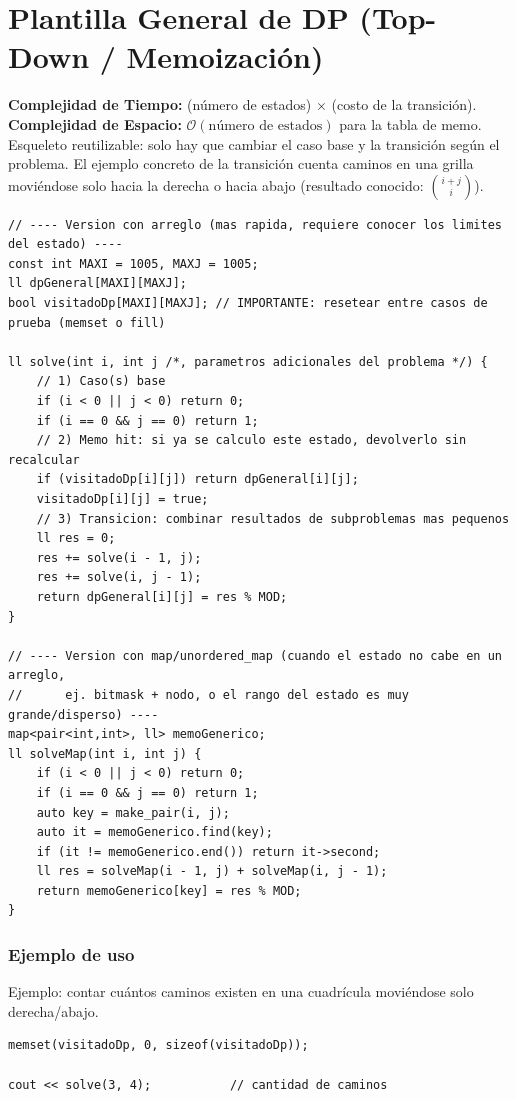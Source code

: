 \documentclass[10pt,twocolumn,letterpaper]{report}
\begin{document}
\section{Plantilla General de DP (Top-Down / Memoización)}
\textbf{Complejidad de Tiempo:} (número de estados) $\times$ (costo de la transición). \\
\textbf{Complejidad de Espacio:} $\mathcal{O}(\text{número de estados})$ para la tabla de memo. \\
Esqueleto reutilizable: solo hay que cambiar el caso base y la transición según el problema. El ejemplo concreto de la transición cuenta caminos en una grilla moviéndose solo hacia la derecha o hacia abajo (resultado conocido: $\binom{i+j}{i}$).
\begin{lstlisting}
// ---- Version con arreglo (mas rapida, requiere conocer los limites del estado) ----
const int MAXI = 1005, MAXJ = 1005;
ll dpGeneral[MAXI][MAXJ];
bool visitadoDp[MAXI][MAXJ]; // IMPORTANTE: resetear entre casos de prueba (memset o fill)

ll solve(int i, int j /*, parametros adicionales del problema */) {
    // 1) Caso(s) base
    if (i < 0 || j < 0) return 0;
    if (i == 0 && j == 0) return 1;
    // 2) Memo hit: si ya se calculo este estado, devolverlo sin recalcular
    if (visitadoDp[i][j]) return dpGeneral[i][j];
    visitadoDp[i][j] = true;
    // 3) Transicion: combinar resultados de subproblemas mas pequenos
    ll res = 0;
    res += solve(i - 1, j);
    res += solve(i, j - 1);
    return dpGeneral[i][j] = res % MOD;
}

// ---- Version con map/unordered_map (cuando el estado no cabe en un arreglo,
//      ej. bitmask + nodo, o el rango del estado es muy grande/disperso) ----
map<pair<int,int>, ll> memoGenerico;
ll solveMap(int i, int j) {
    if (i < 0 || j < 0) return 0;
    if (i == 0 && j == 0) return 1;
    auto key = make_pair(i, j);
    auto it = memoGenerico.find(key);
    if (it != memoGenerico.end()) return it->second;
    ll res = solveMap(i - 1, j) + solveMap(i, j - 1);
    return memoGenerico[key] = res % MOD;
}
\end{lstlisting}
\subsubsection*{Ejemplo de uso}
Ejemplo: contar cuántos caminos existen en una cuadrícula moviéndose solo derecha/abajo.
\begin{lstlisting}
memset(visitadoDp, 0, sizeof(visitadoDp));

cout << solve(3, 4);           // cantidad de caminos
\end{lstlisting}
\end{document}
